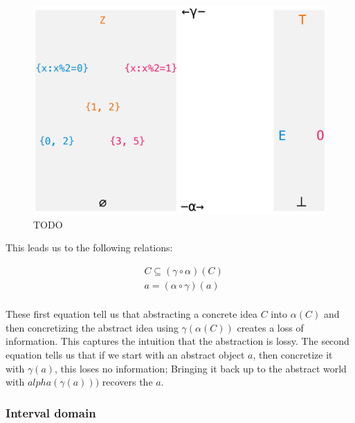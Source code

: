 \documentclass[11pt]{book}
\begin{document}
\begin{figure}[htb]
\includegraphics[width=\textwidth]{./abstract-interpretation.pdf}
\caption{TODO}
\end{figure}

This leads us to the following relations:

\begin{align*}
	&C \subseteq (\gamma\circ \alpha)(C) \\
	&a = (\alpha \circ \gamma)(a) \\
\end{align*}

These first equation tell us that abstracting a concrete idea $C$ into
$\alpha(C)$ and then concretizing the abstract idea using $\gamma(\alpha(C))$
creates a loss of information. This captures the intuition that the abstraction
is lossy. The second equation tells us that if we start with an abstract object
$a$, then concretize it with $\gamma(a)$, this loses no information; Bringing
it back up to the abstract world with $alpha(\gamma(a)))$ recovers the $a$.
\subsubsection{Interval domain}
\end{document}
